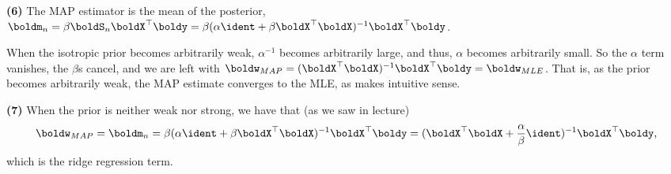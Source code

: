 \documentclass[submit]{harvardml}
\begin{document}
\bigskip

\noindent\textbf{(6)} The MAP estimator is the mean of the posterior, $\boldm_n = \beta\boldS_n\boldX^\top\boldy = \beta(\alpha\ident + \beta\boldX^\top\boldX)^{-1}\boldX^\top\boldy$.

When the isotropic prior becomes arbitrarily weak, $\alpha^{-1}$ becomes arbitrarily large, and thus, $\alpha$ becomes arbitrarily small. So the $\alpha$ term vanishes, the $\beta$s cancel, and we are left with $\boldw_{MAP} = (\boldX^\top\boldX)^{-1}\boldX^\top\boldy = \boldw_{MLE}$. That is, as the prior becomes arbitrarily weak, the MAP estimate converges to the MLE, as makes intuitive sense.

\bigskip

\noindent\textbf{(7)} When the prior is neither weak nor strong, we have that (as we saw in lecture) $$\boldw_{MAP} = \boldm_n = \beta(\alpha\ident + \beta\boldX^\top\boldX)^{-1}\boldX^\top\boldy = (\boldX^\top\boldX +\frac{\alpha}{\beta} \ident)^{-1} \boldX^\top \boldy,$$ which is the ridge regression term.

\end{document}
